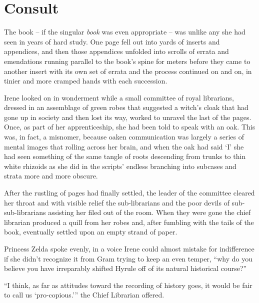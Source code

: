 \documentclass[../FGP.tex]{subfiles}
\begin{document}
\section{Consult}
\begin{fragment}The book -- if the singular \emph{book} was even appropriate -- was unlike any she had seen in years of hard study. One page fell out into yards of inserts and appendices, and then those appendices unfolded into scrolls of errata and emendations running parallel to the book's spine for meters before they came to another insert with its own set of errata and the process continued on and on, in tinier and more cramped hands with each succession. 

Irene looked on in wonderment while a small committee of royal librarians, dressed in an assemblage of green robes that suggested a witch's cloak that had gone up in society and then lost its way, worked to unravel the last of the pages. Once, as part of her apprenticeship, she had been told to speak with an oak. This was, in fact, a misnomer, because oaken communication was largely a series of  mental images that  rolling across her brain, and when the oak had said `I' she had seen something of the same tangle of roots descending from trunks to thin white rhizoids as she did in the scripts' endless branching into subcases and strata more and more obscure.  

After the rustling of pages had finally settled, the leader of the committee cleared her throat and with visible relief the sub-librarians and the poor devils of sub-sub-librarians assisting her filed out of the room. When they were gone the chief librarian produced a quill from her robes and, after fumbling with the tails of the book, eventually settled upon an empty strand of paper. 

Princess Zelda spoke evenly, in a voice Irene could almost mistake for indifference if she didn't recognize it from Gram trying to keep an even temper, ``why do you believe you have irreparably shifted Hyrule off of its natural historical course?''  


\end{fragment}

\begin{fragment}


``I think, as far as attitudes toward the recording of history goes, it would be fair to call us `pro-copious.'{''} the Chief Librarian offered. 


\end{fragment}
\end{document}
